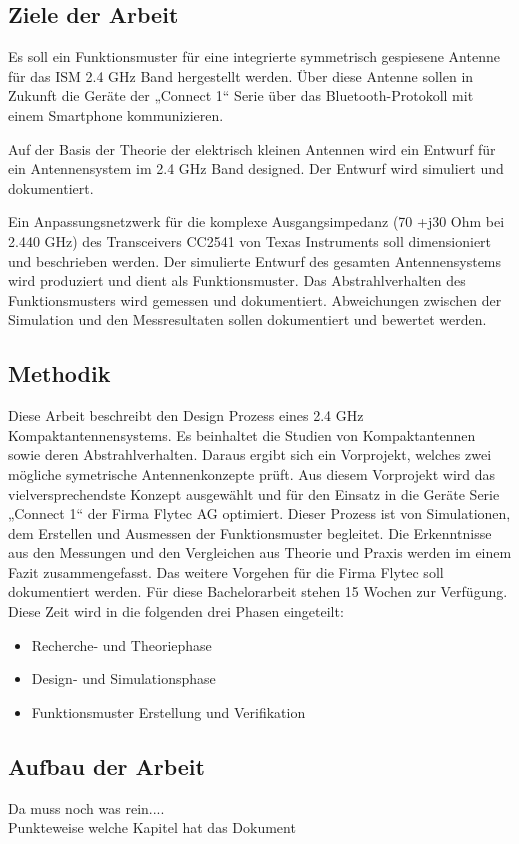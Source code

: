 \subsection{Ziele der Arbeit}
Es soll ein Funktionsmuster für eine integrierte symmetrisch gespiesene Antenne für das ISM 2.4 GHz Band hergestellt werden. Über diese Antenne sollen in Zukunft die Geräte der „Connect 1“ Serie über das Bluetooth-Protokoll mit einem Smartphone kommunizieren. 

Auf der Basis der Theorie der elektrisch kleinen Antennen wird ein Entwurf für ein Antennensystem im 2.4 GHz Band designed. Der Entwurf wird simuliert und dokumentiert. 

Ein Anpassungsnetzwerk  für die komplexe Ausgangsimpedanz (70 +j30 Ohm bei 2.440 GHz) des Transceivers CC2541 von Texas Instruments soll dimensioniert und beschrieben werden.
Der simulierte Entwurf des gesamten Antennensystems wird produziert und dient als Funktionsmuster. Das Abstrahlverhalten des Funktionsmusters wird gemessen und dokumentiert.
Abweichungen zwischen der Simulation und den Messresultaten sollen dokumentiert und bewertet werden.
\subsection{Methodik}
Diese  Arbeit beschreibt den Design Prozess eines 2.4 GHz Kompaktantennensystems. Es beinhaltet die Studien von Kompaktantennen sowie deren Abstrahlverhalten. Daraus ergibt sich ein  Vorprojekt, welches zwei mögliche symetrische Antennenkonzepte prüft. Aus diesem Vorprojekt wird das vielversprechendste Konzept ausgewählt und für den Einsatz in die Geräte Serie „Connect 1“ der Firma Flytec AG optimiert. Dieser Prozess ist von Simulationen, dem  Erstellen und Ausmessen der Funktionsmuster begleitet. Die Erkenntnisse aus den Messungen und den Vergleichen aus Theorie und Praxis werden im einem Fazit zusammengefasst. Das weitere Vorgehen für die Firma Flytec soll dokumentiert werden. Für diese Bachelorarbeit stehen 15 Wochen zur Verfügung. Diese Zeit wird in die folgenden drei Phasen eingeteilt:
\begin{itemize}
	\item Recherche- und Theoriephase
	\item Design- und Simulationsphase 
	\item Funktionsmuster Erstellung und Verifikation
\end{itemize}

\subsection{Aufbau der Arbeit}
Da muss noch was rein....\\
Punkteweise welche Kapitel hat das Dokument




